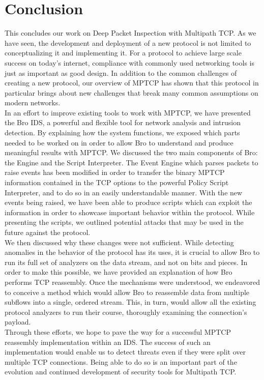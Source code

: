 


\chapter{Conclusion} \label{chap:conclusion}
This concludes our work on Deep Packet Inspection with Multipath TCP. As we have seen, the development and deployment of a new protocol is not limited to conceptualizing it and implementing it. For a protocol to achieve large scale success on today's internet, compliance with commonly used networking tools is just as important as good design. In addition to the common challenges of creating a new protocol, our overview of MPTCP has shown that this protocol in particular brings about new challenges that break many common assumptions on modern networks.\\

In an effort to improve existing tools to work with MPTCP, we have presented the Bro IDS, a powerful and flexible tool for network analysis and intrusion detection. By explaining how the system functions, we exposed which parts needed to be worked on in order to allow Bro to understand and produce meaningful results with MPTCP. We discussed the two main components of Bro: the Engine and the Script Interpreter. The Event Engine which parses packets to raise events has been modified in order to transfer the binary MPTCP information contained in the TCP options to the powerful Policy Script Interpreter, and to do so in an easily understandable manner. With the new events being raised, we have been able to produce scripts which can exploit the information in order to showcase important behavior within the protocol. While presenting the scripts, we outlined potential attacks that may be used in the future against the protocol. \\

We then discussed why these changes were not sufficient. While detecting anomalies in the behavior of the protocol has its uses, it is crucial to allow Bro to run its full set of analyzers on the data stream, and not on bits and pieces. In order to make this possible, we have provided an explanation of how Bro performs TCP reassembly. Once the mechanisms were understood, we endeavored to conceive a method which would allow Bro to reassemble data from multiple subflows into a single, ordered stream. This, in turn, would allow all the existing protocol analyzers to run their course, thoroughly examining the connection's payload.\\

Through these efforts, we hope to pave the way for a successful MPTCP reassembly implementation within an IDS. The success of such an implementation would enable us to detect threats even if they were split over multiple TCP connections. Being able to do so is an important part of the evolution and continued development of security tools for Multipath TCP.